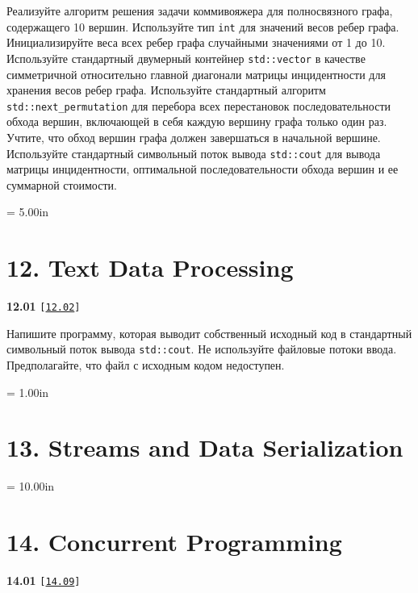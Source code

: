 \documentclass[a4paper,12pt]{article}
\begin{document}
Реализуйте алгоритм решения задачи коммивояжера для полносвязного графа, содержащего 10 вершин. Используйте тип \lstinline{int} для значений весов ребер графа. Инициализируйте веса всех ребер графа случайными значениями от 1 до 10. Используйте стандартный двумерный контейнер \lstinline{std::vector} в качестве симметричной относительно главной диагонали матрицы инцидентности для хранения весов ребер графа. Используйте стандартный алгоритм \lstinline{std::next_permutation} для перебора всех перестановок последовательности обхода вершин, включающей в себя каждую вершину графа только один раз. Учтите, что обход вершин графа должен завершаться в начальной вершине. Используйте стандартный символьный поток вывода \lstinline{std::cout} для вывода матрицы инцидентности, оптимальной последовательности обхода вершин и ее суммарной стоимости.



\newpage\thispagestyle{empty}\pdfpageheight = 5.00in\enlargethispage{100in}

\section{12. Text Data Processing}

{\large \textbf{12.01} \texttt{[\href{https://github.com/i-s-m-mipt/Education/blob/master/projects/examples/source/12.02.cpp}{\texttt{12.02}}]}}

\bigskip

Напишите программу, которая выводит собственный исходный код в стандартный символьный поток вывода \lstinline{std::cout}. Не используйте файловые потоки ввода. Предполагайте, что файл с исходным кодом недоступен.



\newpage\thispagestyle{empty}\pdfpageheight = 1.00in\enlargethispage{100in}

\section{13. Streams and Data Serialization}



\newpage\thispagestyle{empty}\pdfpageheight = 10.00in\enlargethispage{100in}

\section{14. Concurrent Programming}

{\large \textbf{14.01} \texttt{[\href{https://github.com/i-s-m-mipt/Education/blob/master/projects/examples/source/14.09.cpp}{\texttt{14.09}}]}}
\end{document}
